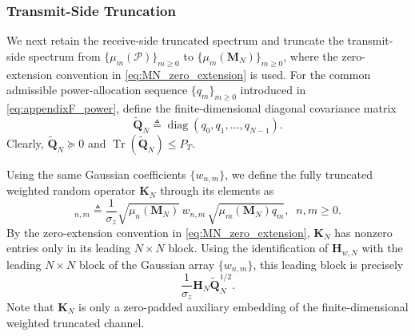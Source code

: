 \documentclass[lettersize,journal]{IEEEtran}
\theoremstyle{plain}
\begin{document}
\subsubsection{Transmit-Side Truncation}

We next retain the receive-side truncated spectrum and truncate
the transmit-side spectrum from
$\{\mu_m(\mathcal P)\}_{m\geq0}$ to
$\{\mu_m(\mathbf M_N)\}_{m\geq0}$, where the zero-extension
convention in \eqref{eq:MN_zero_extension} is used.
For the common admissible power-allocation sequence
$\{q_m\}_{m\geq0}$ introduced in
\eqref{eq:appendixF_power}, define the finite-dimensional
diagonal covariance matrix
\begin{equation}
	\widetilde{\mathbf Q}_N
	\triangleq
	\operatorname{diag}
	(q_0,q_1,\ldots,q_{N-1}).
	\label{eq:QN_from_common_sequence}
\end{equation}
Clearly,
$\widetilde{\mathbf Q}_N\succeq0$ and
$\operatorname{Tr}(\widetilde{\mathbf Q}_N)\leq P_T$.

Using the same Gaussian coefficients $\{w_{n,m}\}$, we define
the fully truncated weighted random operator $\mathbf K_N$
through its elements as
\begin{equation}
	[\mathbf K_N]_{n,m}
	\triangleq
	\frac{1}{\sigma_z}
	\sqrt{\mu_n(\mathbf M_N)}
	\,w_{n,m}\,
	\sqrt{\mu_m(\mathbf M_N)q_m},
	\;\; n,m\geq0.
	\label{eq:KN_element}
\end{equation}
By the zero-extension convention in
\eqref{eq:MN_zero_extension}, $\mathbf K_N$ has nonzero entries
only in its leading $N\times N$ block. Using the identification
of $\mathbf H_{w,N}$ with the leading $N\times N$ block of the
Gaussian array $\{w_{n,m}\}$, this leading block is precisely
\begin{equation}
	\frac{1}{\sigma_z}
	\mathbf H_N
	\widetilde{\mathbf Q}_N^{1/2}.
	\label{eq:KN_leading_block}
\end{equation}
Note that $\mathbf K_N$ is only a
zero-padded auxiliary embedding of the finite-dimensional
weighted truncated channel.
\end{document}
